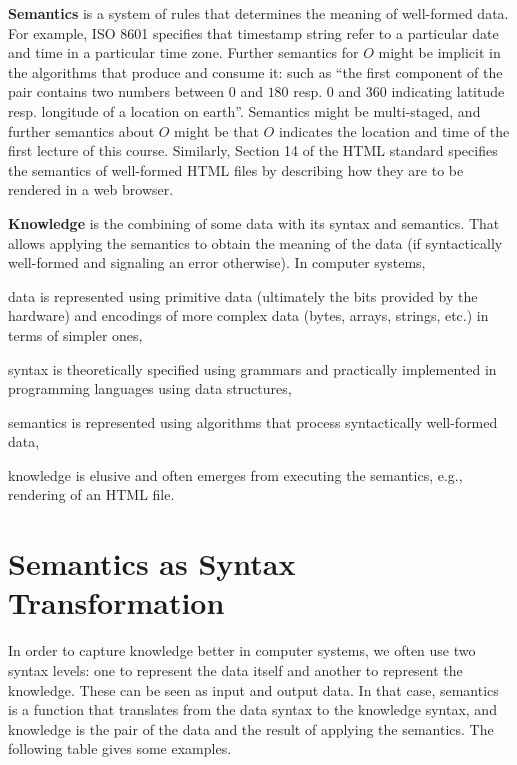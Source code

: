 \textbf{Semantics} is a system of rules that determines the meaning of well-formed data.
For example, ISO 8601 specifies that timestamp string refer to a particular date and time in a particular time zone.
Further semantics for $O$ might be implicit in the algorithms that produce and consume it: such as ``the first component of the pair contains two numbers between $0$ and $180$ resp. $0$ and $360$ indicating latitude resp. longitude of a location on earth''.
Semantics might be multi-staged, and further semantics about $O$ might be that $O$ indicates the location and time of the first lecture of this course.
Similarly, Section 14 of the HTML standard specifies the semantics of well-formed HTML files by describing how they are to be rendered in a web browser.

\textbf{Knowledge} is the combining of some data with its syntax and semantics.
That allows applying the semantics to obtain the meaning of the data (if syntactically well-formed and signaling an error otherwise).
In computer systems,
\begin{compactitem}
 \item data is represented using primitive data (ultimately the bits provided by the hardware) and encodings of more complex data (bytes, arrays, strings, etc.) in terms of simpler ones,
 \item syntax is theoretically specified using grammars and practically implemented in programming languages using data structures,
 \item semantics is represented using algorithms that process syntactically well-formed data,
 \item knowledge is elusive and often emerges from executing the semantics, e.g., rendering of an HTML file.
\end{compactitem}

\section{Semantics as Syntax Transformation}

In order to capture knowledge better in computer systems, we often use two syntax levels: one to represent the data itself and another to represent the knowledge.
These can be seen as input and output data.
In that case, semantics is a function that translates from the data syntax to the knowledge syntax, and knowledge is the pair of the data and the result of applying the semantics.
The following table gives some examples.

